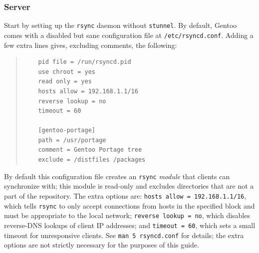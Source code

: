 \documentclass{article}
\begin{document}
\subsubsection{Server}
Start by setting up the \texttt{rsync} daemon without \texttt{stunnel}.  By default, Gentoo comes with a disabled but sane configuration file at \texttt{/etc/rsyncd.conf}.  Adding a few extra lines gives, excluding comments, the following:
\begin{quote}
\begin{verbatim}
	pid file = /run/rsyncd.pid
	use chroot = yes
	read only = yes
	hosts allow = 192.168.1.1/16
	reverse lookup = no
	timeout = 60

	[gentoo-portage]
	path = /usr/portage
	comment = Gentoo Portage tree
	exclude = /distfiles /packages
\end{verbatim}
\end{quote}
By default this configuration file creates an \texttt{rsync} \textit{module} that clients can synchronize with; this module is read-only and excludes directories that are not a part of the repository.  The extra options are: \texttt{hosts allow = 192.168.1.1/16}, which tells \texttt{rsync} to only accept connections from hosts in the specified block and must be appropriate to the local network; \texttt{reverse lookup = no}, which disables reverse-DNS lookups of client IP addresses; and \texttt{timeout = 60}, which sets a small timeout for unresponsive clients.  See \texttt{man 5 rsyncd.conf} for details; the extra options are not strictly necessary for the purposes of this guide.
\end{document}

